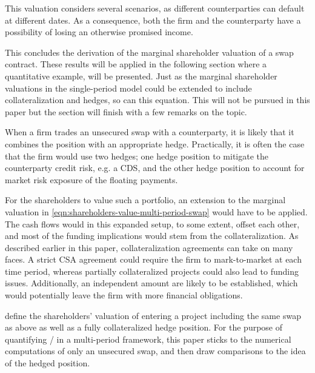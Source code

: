 \documentclass[main.tex]{subfiles}
\begin{document}
        This valuation considers several scenarios, as different counterparties can default at different dates.
        As a consequence, both the firm and the counterparty have a possibility of losing an otherwise promised income.

        This concludes the derivation of the marginal shareholder valuation of a swap contract.
        These results will be applied in the following section where a quantitative example,
        will be presented.
        Just as the marginal shareholder valuations in the single-period model
        could be extended to include collateralization and hedges, so can this equation.
        This will not be pursued in this paper 
        but the section will finish with a few remarks on the topic.

        When a firm trades an unsecured swap with a counterparty,
        it is likely that it combines the position with an appropriate hedge.
        Practically, it is often the case that the firm would use two hedges;
        one hedge position to mitigate the counterparty credit risk, e.g. a CDS,
        and the other hedge position to account for market risk exposure of the floating payments.

        For the shareholders to value such a portfolio,
        an extension to the marginal valuation in 
        \cref{eqn:shareholders-value-multi-period-swap} would have to be applied.
        The cash flows would in this expanded setup, to some extent, offset each other,
        and most of the funding implications would stem from the collateralization.
        As described earlier in this paper, collateralization agreements can take on many faces.
        A strict CSA agreement could require the firm to mark-to-market at each time period,
        whereas partially collateralized projects could also lead to funding issues.
        Additionally, an independent amount are likely to be established,
        which would potentially leave the firm with more financial obligations.

        \textcite{ADS2018} define the shareholders' valuation of entering a project including the same swap as above as well as a fully collateralized hedge position.
        For the purpose of quantifying \FVA/ in a multi-period framework,
        this paper sticks to the numerical computations of only an unsecured swap,
        and then draw comparisons to the idea of the hedged position.
        
\end{document}
